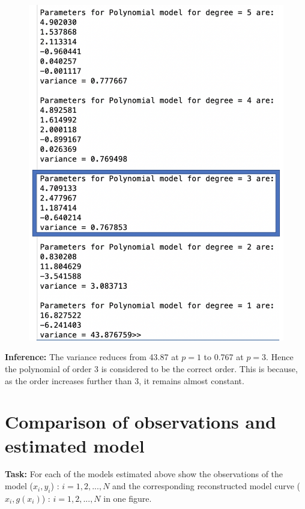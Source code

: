 \begin{figure}[H]
\endminipage\hfill
{}%
  \includegraphics[width=\linewidth]{ass4_2.png}
\endminipage
\end{figure}

\noindent \textbf{Inference:} The variance reduces from 43.87 at $p = 1$ to 0.767 at $p = 3.$ Hence the polynomial of order 3 is considered to be the correct order. This is because, as the order increases further than 3, it remains almost constant.

\section{Comparison of observations and estimated model}  \label{Comparison of observations and estimated model}
\noindent \textbf{Task:} For each of the models estimated above show the observations of the model ($x_i, y_i$) : $i = 1,2,...,N$ and the corresponding reconstructed model curve ($x_i, g(x_i)$) : $i = 1,2,...,N$ in one figure.
 

